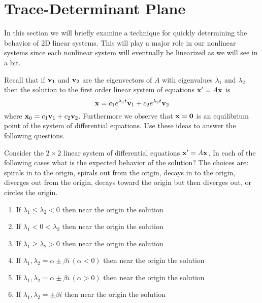 \newpage\section{Trace-Determinant Plane}
In this section we will briefly examine a technique for quickly determining
the behavior of 2D linear systems.  This will play a major role in our nonlinear systems
since each nonlinear system will eventually be linearized as we will see in a bit.  


Recall that if ${\bf v}_1$ and ${\bf v}_2$ are the eigenvectors of $A$ with eigenvalues
$\lambda_1$ and $\lambda_2$ then the solution to the first order linear system of
equations ${\bf x}' = A {\bf x}$ is
\[ {\bf x} = c_1 e^{\lambda_1 t} {\bf v}_1 + c_2 e^{\lambda_2 t} {\bf v}_2 \]
where ${\bf x}_0 = c_1 {\bf v}_1 + c_2 {\bf v}_2$.  Furthermore we observe that ${\bf x} = {\bf 0}$ is an
equilibrium point of the system of differential equations.  Use these ideas to answer the
following questions.
\begin{problem}
    Consider the $2\times 2$ linear system of differential equations ${\bf x}'=A{\bf x}$.  In each
    of the following cases what is the expected behavior of the solution? The choices are:
    spirals in to the origin, spirals out from the origin, decays in to the origin,
    diverges out from the origin, decays toward the origin but then diverges out, or
    circles the origin.
            \begin{enumerate}
                \item If $\lambda_1 \le \lambda_2 < 0$ then near the origin the
                    solution \underline{\hspace{1in}}
                \item If $\lambda_1 < 0 < \lambda_2$ then near the origin the
                    solution \underline{\hspace{1in}}
                \item If $\lambda_1 \ge \lambda_2 > 0$ then near the origin the
                    solution \underline{\hspace{1in}}
                \item If $\lambda_1, \lambda_2 = \alpha \pm \beta i \, (\alpha<0)$ then
                    near the origin the solution \underline{\hspace{1in}}
                \item If $\lambda_1, \lambda_2 = \alpha \pm \beta i \, (\alpha>0)$ then
                    near the origin the solution \underline{\hspace{1in}}
                \item If $\lambda_1, \lambda_2 = \pm \beta i$ then near the origin
                    the solution \underline{\hspace{1in}}
            \end{enumerate}
\end{problem}


